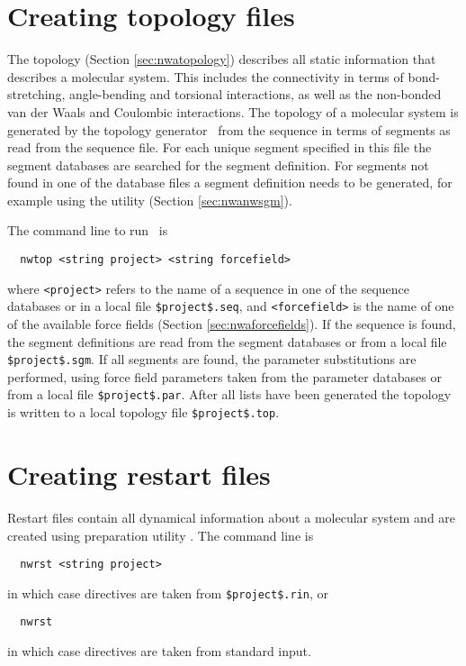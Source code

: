 \section{Creating topology files}
\label{sec:nwanwtop}

The topology (Section \ref{sec:nwatopology}) describes all static information
that describes a molecular system. This includes the connectivity in
terms of bond-stretching, angle-bending and torsional interactions, as well as
the non-bonded van der Waals and Coulombic interactions.
The topology of a molecular system is generated by the topology
generator \nwtop\ from the sequence in terms of segments as read from
the sequence file. For each unique segment specified in this file the 
segment databases are searched for the segment definition. For
segments not found in one of the database files a segment definition
needs to be generated, for example using the utility \nwsgm (Section \ref{sec:nwanwsgm}).

The command line to run \nwtop\ is
\begin{verbatim}
  nwtop <string project> <string forcefield>
\end{verbatim}
where \verb+<project>+ refers to the name of a sequence in one of the
sequence databases or in a local file \verb+$project$.seq+, and
\verb+<forcefield>+ is the name of one of the available force fields 
(Section \ref{sec:nwaforcefields}).
If the sequence is found, the segment definitions are read from the
segment databases or from a local file \verb+$project$.sgm+. If all
segments are found, the parameter substitutions are performed, using
force field parameters taken from the parameter databases or from a 
local file \verb+$project$.par+. After all lists have been generated the
topology is written to a local topology file \verb+$project$.top+.

\section{Creating restart files}
\label{sec:nwanwrst}
Restart files contain all dynamical information about a molecular
system and are created using preparation utility \nwrst. The command
line is
\begin{verbatim}
  nwrst <string project>
\end{verbatim}
in which case directives are taken from \verb+$project$.rin+, or
\begin{verbatim}
  nwrst
\end{verbatim}
in which case directives are taken from standard input.


